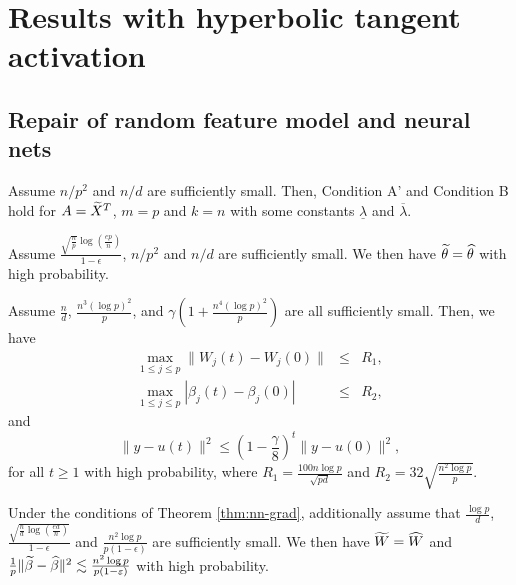 
\appendix

\section{Results with hyperbolic tangent activation}


\subsection{Repair of random feature model and neural nets} \label{app:results}


\begin{lemma}\label{lem:design-rf}
Assume $n/p^2$ and $n/d$ are sufficiently small. Then, Condition A' and Condition B hold for $A=\widetilde{X}^T$, $m=p$ and $k=n$ with some constants $\underline{\lambda}$ and $\overline{\lambda}$.
\end{lemma}


\begin{corollary}\label{cor:repair-rf}
Assume $\frac{\sqrt{\frac{n}{p}}\log\left(\frac{ep}{n}\right)}{1-\epsilon}$, $n/p^2$ and $n/d$ are sufficiently small. We then have $\widetilde{\theta}=\widehat{\theta}$ with high probability.
\end{corollary}

\begin{thm}\label{thm:nn-grad}
Assume $\frac{n}{d}$, $\frac{n^3(\log p)^2}{p}$, and $\gamma\left(1+\frac{n^4(\log p)^2}{p}\right)$ are all sufficiently small. Then, we have
\begin{eqnarray}
\label{eq:iter-parameter} \max_{1\leq j\leq p}\|W_j(t)-W_j(0)\| &\leq& R_1, \\
\label{eq:iter-parameter-beta} \max_{1\leq j\leq p}|\beta_j(t)-\beta_j(0)| &\leq& R_2,
\end{eqnarray}
and
\begin{equation}
\|y-u(t)\|^2 \leq \left(1-\frac{\gamma}{8}\right)^t\|y-u(0)\|^2, \label{eq:iter-function}
\end{equation}
for all $t\geq 1$ with high probability, where $R_1=\frac{100n\log p}{\sqrt{pd}}$ and $R_2=32\sqrt{\frac{n^2\log p}{p}}$.
\end{thm}

\begin{thm}\label{thm:repair-nn-1}
Under the conditions of Theorem \ref{thm:nn-grad}, additionally assume that $\frac{\log p}{d}$, $\frac{\sqrt{\frac{n}{d}\log\left(\frac{ed}{n}\right)}}{1-\epsilon}$ and $\frac{n^2\log p}{p(1-\epsilon)}$ are sufficiently small. We then have $\widetilde{W}=\widehat{W}$ and $\frac{1}{p}\|\widetilde{\beta}-\widehat{\beta}\|^2 \lesssim \frac{n^2\log p}{p(1-\varepsilon)}$ with high probability.
\end{thm}

